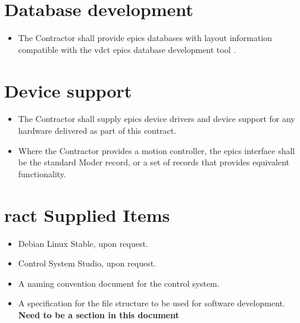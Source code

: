 \documentclass[11pt
  , a4paper
  , article
  , oneside
]{memoir}
\begin{document}
\section{Database development}
\begin{itemize}
  \item The Contractor shall provide \Gls{epics} databases with layout information compatible with the \Gls{vdct} \Gls{epics} database development tool \cite{vdct}.
\end{itemize}


\section{Device support}
\begin{itemize}
\item The Contractor shall supply \Gls{epics} device drivers and device support for any hardware delivered as part of this contract.
\item Where the Contractor provides a motion controller, the \Gls{epics} interface shall be the standard Moder record, or a set of records that provides equivalent functionality.
\end{itemize}

\section{\Gls{ract} Supplied Items}
\begin{itemize}
\item Debian Linux Stable, upon request.
\item Control System Studio, upon request.
\item A naming convention document for the control system.
\item A specification for the file structure to be used for software development. \textbf{Need to be a section in this document}
\end{itemize}
\end{document}
